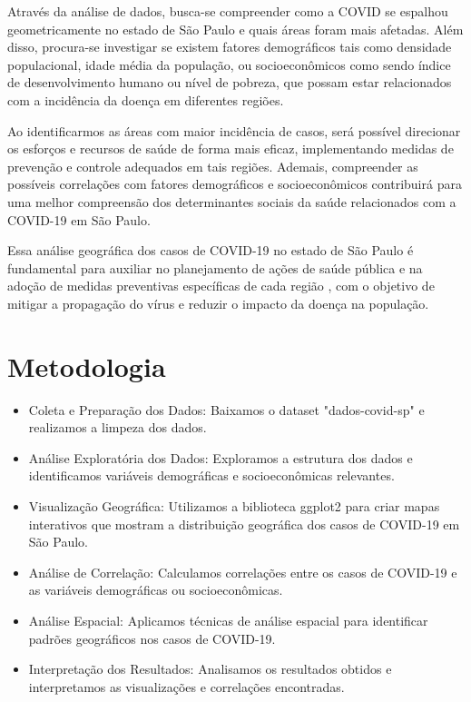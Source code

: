 \documentclass[12pt]{report}
\theoremstyle{definition}
\theoremstyle{plain}
\theoremstyle{exemplo}
\theoremstyle{solution}
\theoremstyle{obs}
\begin{document}
Através da análise de dados, busca-se compreender como a COVID se espalhou geometricamente no estado de São Paulo e quais áreas foram mais afetadas. Além disso, procura-se investigar se existem fatores demográficos tais como densidade populacional, idade média da população, ou socioeconômicos como sendo índice de desenvolvimento humano ou nível de pobreza, que possam estar relacionados com a incidência da doença em diferentes regiões.

Ao identificarmos as áreas com maior incidência de casos, será possível direcionar os esforços e recursos de saúde de forma mais eficaz, implementando medidas de prevenção e controle adequados em tais regiões. Ademais, compreender as possíveis correlações com fatores demográficos e socioeconômicos contribuirá para uma melhor compreensão dos determinantes sociais da saúde relacionados com a COVID-19 em São Paulo.

Essa análise geográfica dos casos de COVID-19 no estado de São Paulo é fundamental para auxiliar no planejamento de ações de saúde pública e na adoção de medidas preventivas específicas de cada região , com o objetivo de mitigar a propagação do vírus e reduzir o impacto da doença na população. 


\chapter{Metodologia}

\begin{itemize}
	\item Coleta e Preparação dos Dados: Baixamos o dataset "dados-covid-sp" e realizamos a limpeza dos dados.
	
	\item Análise Exploratória dos Dados: Exploramos a estrutura dos dados e identificamos variáveis demográficas e socioeconômicas relevantes.
	
	\item Visualização Geográfica: Utilizamos a biblioteca ggplot2 para criar mapas interativos que mostram a distribuição geográfica dos casos de COVID-19 em São Paulo.
	
	\item Análise de Correlação: Calculamos correlações entre os casos de COVID-19 e as variáveis demográficas ou socioeconômicas.
	
	\item Análise Espacial: Aplicamos técnicas de análise espacial para identificar padrões geográficos nos casos de COVID-19.
	
	\item Interpretação dos Resultados: Analisamos os resultados obtidos e interpretamos as visualizações e correlações encontradas.
\end{itemize}
\end{document}
